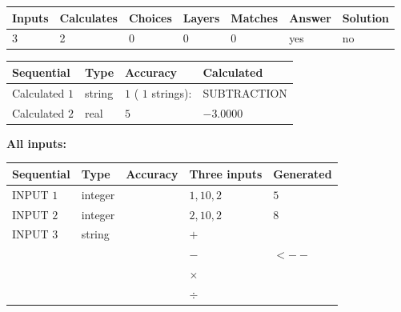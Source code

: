 \documentclass[12pt]{article}
\begin{document}
 
 
\noindent{}
 
 

 
\vspace{0.3in}
   
   
   
   
\noindent\begin{tabular}{|l|l|l|l|l|l|l|}
 \hline
Inputs & Calculates & Choices & Layers & Matches & Answer & Solution \\ \hline
           3  & 
           2  & 
           0
  & 
           0  & 
           0  & 
  yes & 
  no 
  \\ \hline
 \end{tabular}
   
   
   
   
\noindent{}
   
   
  
  
\noindent\begin{tabular}{|l|l|l|l|}
\hline
 Sequential & Type & Accuracy & Calculated \\ 
\hline
 
 
  Calculated $            1 $ & string & $            1  $ ( $           1  $ strings): 
 & SUBTRACTION
 \\  \hline  
 
 
  Calculated $            2 $ & real & $            5  $ & 
 $ -3.0000 $ 
 \\  \hline  
 \end{tabular}
   
   
   
   
\noindent\vspace{0.1in}\hspace{-0.08in} {\textbf{\Large{All inputs: }}}
   
   
  
  
\noindent\begin{tabular}{|l|l|l|l|l|}
\hline
 Sequential & Type & Accuracy & Three inputs & Generated \\ 
\hline
 
 
  INPUT $            1 $ & integer &  & $
 1
 , 
 10
 , 
 2
 $ & $ 5 $ 
 \\  \hline  
 
 
  INPUT $            2 $ & integer &  & $
 2
 , 
 10
 , 
 2
 $ & $ 8 $ 
 \\  \hline  
 
 
  INPUT $            3 $ & string & & 
 $+$ & 
  \\
  & & & 
 $-$ & 
  $ <-- $ 
  \\
  & & & 
 $\times$ & 
  \\
  & & & 
 $\div$ & 
 \\  \hline  
 \end{tabular}
   
\end{document}
